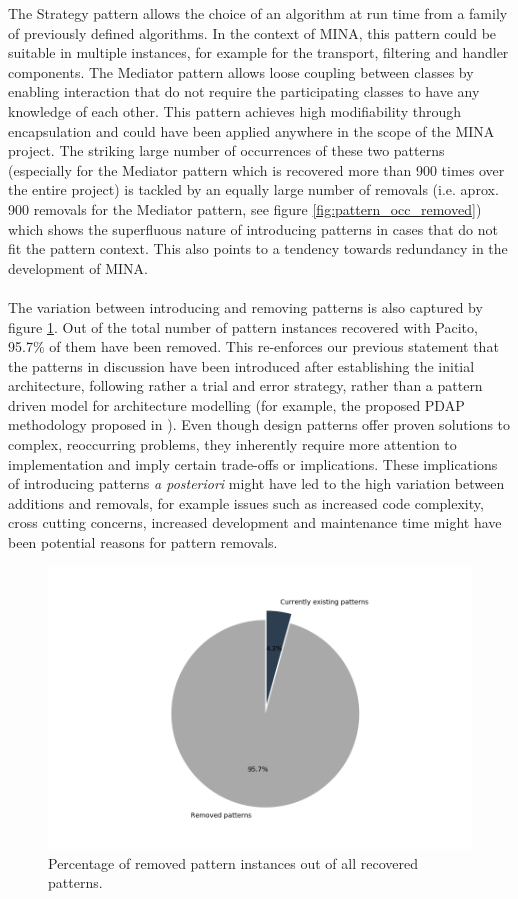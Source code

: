 The Strategy pattern allows the choice of an algorithm at run time from a family of previously defined algorithms. In the context of MINA, this pattern could be suitable in multiple instances, for example for the transport, filtering and handler components. The Mediator pattern allows loose coupling between classes by enabling interaction that do not require the participating classes to have any knowledge of each other. This pattern achieves high modifiability through encapsulation and could have been applied anywhere in the scope of the MINA project. The striking large number of occurrences of these two patterns (especially for the Mediator pattern which is recovered more than 900 times over the entire project) is tackled by an equally large number of removals (i.e. aprox. 900 removals for the Mediator pattern, see figure \ref{fig:pattern_occ_removed}) which shows the superfluous nature of introducing patterns in cases that do not fit the pattern context. This also points to a tendency towards redundancy in the development of MINA. \\\\
The variation between introducing and removing patterns is also captured by figure \ref{fig:per_removed_patterns}. Out of the total number of pattern instances recovered with Pacito, 95.7\% of them have been removed. This re-enforces our previous statement that the patterns in discussion have been introduced after establishing the initial architecture, following rather a trial and error strategy, rather than a pattern driven model for architecture modelling (for example, the proposed PDAP methodology proposed in \cite{pdap}). Even though design patterns offer proven solutions to complex, reoccurring problems, they inherently require more attention to implementation and imply certain trade-offs or implications. These implications of introducing patterns \textit{a posteriori} might have led to the high variation between additions and removals, for example issues such as increased code complexity, cross cutting concerns, increased development and maintenance time might have been potential reasons for pattern removals. 
\begin{figure}
    \centering
    \includegraphics[width =  \textwidth]{images/graphs/current_removed_per.png}
    \caption{Percentage of removed pattern instances out of all recovered patterns.}
    \label{fig:per_removed_patterns}
\end{figure}

